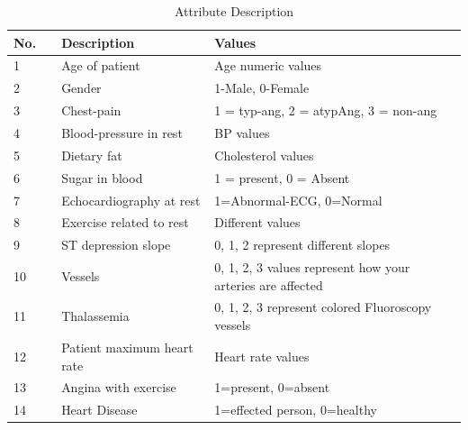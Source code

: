 \documentclass[journal, twoside, final]{IEEEtran}
\begin{document}
\begin{table}[htbp]
  \centering
  \caption{Attribute Description}
  \begin{tabular}{|p{0.2cm}|p{0.95cm}|p{1.9cm}|p{2.5cm}|}
    \hline
    {\textbf{No.}} &\centering{\textbf{Attribute}} & {\textbf{Description}} & {\textbf{Values}} \\
    \hline
    1 & \centering{age} & Age of patient & Age numeric values \\
 \hline
    2 & \centering{gender} & Gender & 1-Male, 0-Female \\
 \hline
    3 & \centering{C\_P} & Chest-pain & 1 = typ-ang, 2 = atypAng, 3 = non-ang \\
 \hline
    4 & \centering{trest\_bps} & Blood-pressure in rest & BP values \\
 \hline
    5 & \centering{CHOL} & Dietary fat & Cholesterol values \\
 \hline
    6 & \centering{F-B-S} & Sugar in blood & 1 = present, 0 = Absent \\
 \hline
    7 & \centering{restecg} & Echocardiography at rest & 1=Abnormal-ECG, 0=Normal \\
 \hline
    8 & \centering{oldpeak} & Exercise related to rest & Different values \\
 \hline
    9 & \centering{slope} & ST depression slope & 0, 1, 2 represent different slopes \\
 \hline
    10 & \centering{CA} & Vessels & 0, 1, 2, 3 values represent how your arteries are affected \\
 \hline
    11 & \centering{thal} & Thalassemia & 0, 1, 2, 3 represent colored Fluoroscopy vessels \\
 \hline
    12 & \centering{thalach} & Patient maximum heart rate & Heart rate values \\
 \hline
    13 & \centering{exang} & Angina with exercise & 1=present, 0=absent \\
 \hline
    14 & \centering{target} & Heart Disease & 1=effected person, 0=healthy \\
    \hline
  \end{tabular}
\end{table}
\end{document}
